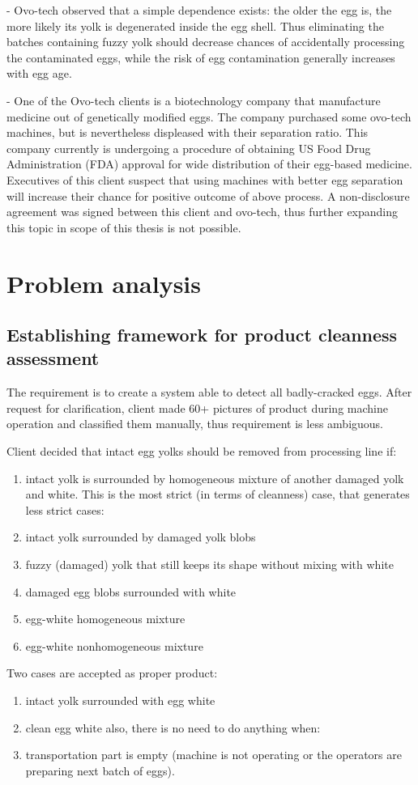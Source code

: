 \documentclass[12pt,twoside,a4paper]{article}
\begin{document}
- Ovo-tech observed that a simple dependence exists: the older the egg is, the more likely its yolk is degenerated inside the egg shell.
Thus eliminating the batches containing fuzzy yolk should decrease chances of accidentally processing the contaminated eggs, while the risk of egg contamination generally increases with egg age.

- One of the Ovo-tech clients is a biotechnology company that manufacture medicine out of genetically modified eggs.
The company purchased some ovo-tech machines, but is nevertheless displeased with their separation ratio.
This company currently is undergoing a procedure of obtaining US Food Drug Administration (FDA) approval for wide distribution of their egg-based medicine.
Executives of this client suspect that using machines with better egg separation will increase their chance for positive outcome of above process.
A non-disclosure agreement was signed between this client and ovo-tech, thus further expanding this topic in scope of this thesis is not possible.


\section{Problem analysis}
\subsection{Establishing framework for product cleanness assessment}

The requirement is to create a system able to detect all badly-cracked eggs.
After request for clarification, client made 60+ pictures of product during machine operation and classified them manually, thus requirement is less ambiguous.

Client decided that intact egg yolks should be removed from processing line if:

\begin{enumerate}
\item intact yolk is surrounded by homogeneous mixture of another damaged yolk and white.
This is the most strict (in terms of cleanness) case, that generates less strict cases:
\item intact yolk surrounded by damaged yolk blobs
\item fuzzy (damaged) yolk that still keeps its shape without mixing with white
\item damaged egg blobs surrounded with white
\item egg-white homogeneous mixture
\item egg-white nonhomogeneous mixture
\end{enumerate}
Two cases are accepted as proper product:
\begin{enumerate}[resume]
\item intact yolk surrounded with egg white
\item clean egg white
also, there is no need to do anything when:
\item transportation part is empty (machine is not operating or the operators are preparing next batch of eggs).
\end{enumerate}
\end{document}
